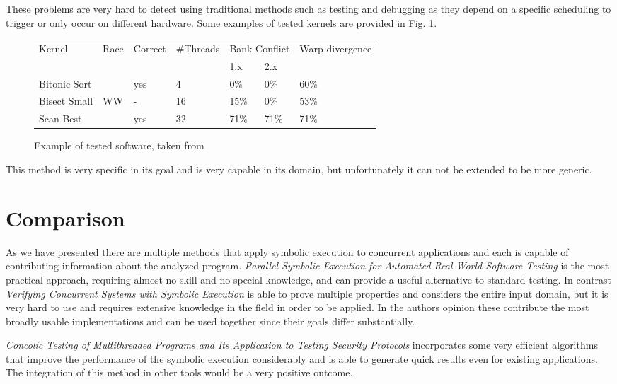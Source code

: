 \documentclass[10pt]{llncs}
\begin{document}
These problems are very hard to detect using traditional methods such as testing and debugging as they depend on a specific scheduling to trigger or only occur on different hardware. Some examples of tested kernels are provided in Fig. \ref{example:7}.

\begin{figure}
	\centering
	
	\begin{tabular}{l l l l l l l}
		Kernel & Race & Correct & \#Threads & \multicolumn{2}{c}{Bank Conflict} & Warp divergence\\
		& & & & 1.x & 2.x & \\
		\hline
		
		Bitonic Sort & & yes & 4 & 0\% & 0\% & 60\% \\
		Bisect Small & WW & - & 16 & 15\% & 0\% & 53\% \\
		Scan Best & & yes & 32 & 71\% & 71\% & 71\%
	\end{tabular}
	
	\caption{Example of tested software, taken from \cite{base7}}
	\label{example:7}
\end{figure}

This method is very specific in its goal and is very capable in its domain, but unfortunately it can not be extended to be more generic.

\section{Comparison}

As we have presented there are multiple methods that apply symbolic execution to concurrent applications and each is capable of contributing information about the analyzed program. \emph{Parallel Symbolic Execution for Automated Real-World Software Testing} \cite{base3} is the most practical approach, requiring almost no skill and no special knowledge, and can provide a useful alternative to standard testing. In contrast \emph{Verifying Concurrent Systems with Symbolic Execution} \cite{base2} is able to prove multiple properties and considers the entire input domain, but it is very hard to use and requires extensive knowledge in the field in order to be applied. In the authors opinion these contribute the most broadly usable implementations and can be used together since their goals differ substantially.

\emph{Concolic Testing of Multithreaded Programs and Its Application to Testing Security Protocols} \cite{base4} incorporates some very efficient algorithms that improve the performance of the symbolic execution considerably and is able to generate quick results even for existing applications. The integration of this method in other tools would be a very positive outcome.
\end{document}
